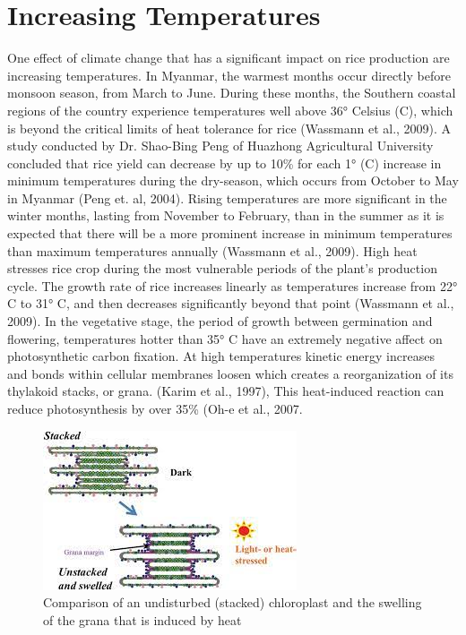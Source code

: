 \documentclass{book}\usepackage{knitr}
\begin{document}
\section{Increasing Temperatures}
One effect of climate change that has a significant impact on rice production are increasing temperatures. In Myanmar, the warmest months occur directly before monsoon season, from March to June. During these months, the Southern coastal regions of the country experience temperatures well above 36° Celsius (C), which is beyond the critical limits of heat tolerance for rice (Wassmann et al., 2009). A study conducted by Dr. Shao-Bing Peng of Huazhong Agricultural University concluded that rice yield can decrease by up to 10\% for each 1° (C) increase in minimum temperatures during the dry-season, which occurs from October to May in Myanmar (Peng et. al, 2004). Rising temperatures are more significant in the winter months, lasting from November to February, than in the summer as it is expected that there will be a more prominent increase in minimum temperatures than maximum temperatures annually (Wassmann et al., 2009). 
High heat stresses rice crop during the most vulnerable periods of the plant’s production cycle. The growth rate of rice increases linearly as temperatures increase from 22° C to 31° C, and then decreases significantly beyond that point (Wassmann et al., 2009). In the vegetative stage, the period of growth between germination and flowering, temperatures hotter than 35° C have an extremely negative affect on photosynthetic carbon fixation. At high temperatures kinetic energy increases and bonds within cellular membranes loosen which creates a reorganization of its thylakoid stacks, or grana. (Karim et al., 1997), This heat-induced reaction can reduce photosynthesis by over 35\% (Oh-e et al., 2007.

\begin{figure}
\includegraphics[width=\linewidth]{images/myanmar/Image4.jpg}
\caption{Comparison of an undisturbed (stacked) chloroplast and the swelling of the grana that is induced by heat}
\end{figure}
\end{document}

